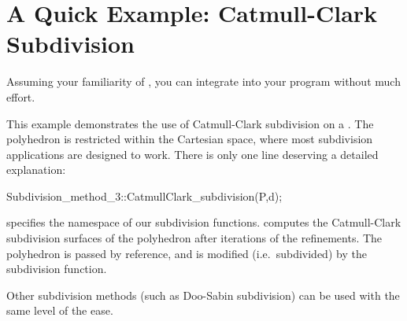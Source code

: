 



\section{A Quick Example: Catmull-Clark Subdivision}
\label{secFirstSub}
Assuming your familiarity of ,
you can integrate  into your program 
without much effort.


This example demonstrates the use of Catmull-Clark subdivision
on a . The polyhedron is restricted within the Cartesian
space, where most subdivision applications are designed to work.
There is only one line deserving a detailed explanation:
\begin{ccExampleCode}
Subdivision_method_3::CatmullClark_subdivision(P,d);
\end{ccExampleCode}
 specifies the namespace of our
subdivision functions.  computes the 
Catmull-Clark subdivision surfaces of the polyhedron  after
 iterations of the refinements. The polyhedron  is 
passed by reference, and is modified (i.e.~subdivided) by the 
subdivision function.

Other subdivision methods (such as Doo-Sabin subdivision) can be
used with the same level of the ease.

